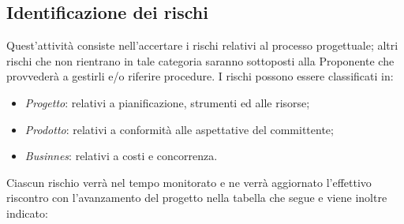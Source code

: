 \documentclass[12pt,a4paper,titlepage]{article}
\begin{document}
	\subsection{Identificazione dei rischi}
		Quest'attività consiste nell'accertare i rischi relativi al processo progettuale; altri rischi che non rientrano in tale categoria saranno sottoposti alla Proponente che provvederà a gestirli e/o riferire procedure.
		I rischi possono essere classificati in:
		\begin{itemize}
			\item \textit{Progetto}: relativi a pianificazione, strumenti ed alle risorse;
			\item \textit{Prodotto}: relativi a conformità alle aspettative del committente;
			\item \textit{Businnes}: relativi a costi e concorrenza.
		\end{itemize}
		Ciascun rischio verrà nel tempo monitorato e ne verrà aggiornato l'effettivo riscontro con l'avanzamento del progetto nella tabella che segue e viene inoltre indicato:
\end{document}
